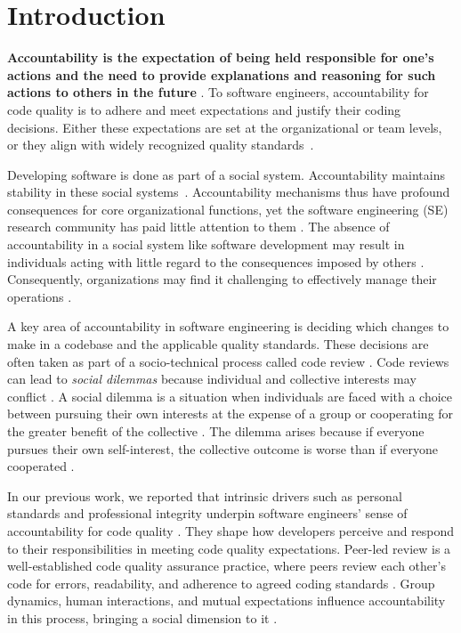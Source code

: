 \section{Introduction}\label{sec:introduction}

\noindent \textbf{Accountability is the expectation of being held responsible for one's actions and the need to provide explanations and reasoning for such actions to others in the future} \citep{de2007justifying,lerner1999accounting,frink1998toward}. To software engineers, accountability for code quality is to adhere and meet expectations and justify their coding decisions. Either these expectations are set at the organizational or team levels, or they align with widely recognized quality standards~\citep{alami2024understanding}.

Developing software is done as part of a social system. Accountability maintains stability in these social systems~\citep{frink2004advancing}. Accountability mechanisms thus have profound consequences for core organizational functions, yet the software engineering (SE) research community has paid little attention to them \citep{alami2024understanding}. The absence of accountability in a social system like software development may result in individuals acting with little regard to the consequences imposed by others \citep{hall2017accountability}. Consequently, organizations may find it challenging to effectively manage their operations \citep{frink1998toward}. 

A key area of accountability in software engineering is deciding which changes to make in a codebase and the applicable quality standards. These decisions are often taken as part of a socio-technical process called code review \citep{meneely2014empirical,bosu2016process}. Code reviews can lead to \emph{social dilemmas} because individual and collective interests may conflict \citep{de2009paying,de2001less}. A social dilemma is a situation when individuals are faced with a choice between pursuing their own interests at the expense of a group or cooperating for the greater benefit of the collective \citep{de2009paying,de2001less}. The dilemma arises because if everyone pursues their own self-interest, the collective outcome is worse than if everyone cooperated \citep{de2009paying,de2001less}.

In our previous work, we reported that intrinsic drivers such as personal standards and professional integrity underpin software engineers' sense of accountability for code quality \citep{alami2024understanding}. They shape how developers perceive and respond to their responsibilities in meeting code quality expectations. Peer-led review is a well-established code quality assurance practice, where peers review each other's code for errors, readability, and adherence to agreed coding standards \citep{mcintosh2016empirical,alami2019affiliated}. Group dynamics, human interactions, and mutual expectations influence accountability in this process, bringing a social dimension to it \citep{alami2024understanding}.

